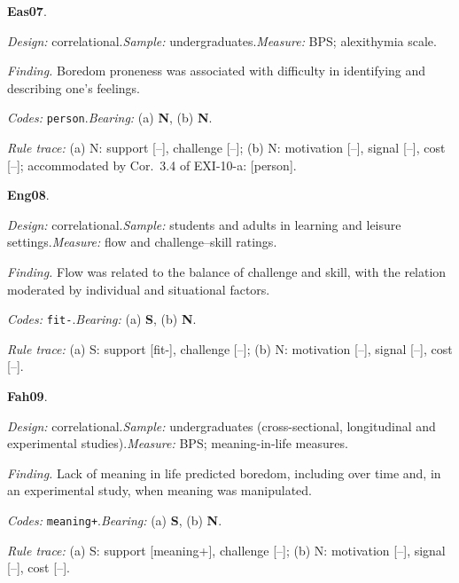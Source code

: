 \medskip
{}
\noindent\textbf{Eas07}\enspace \citet{Eastwood2007}.\par
{\small\noindent\textit{Design:} correlational.\quad \textit{Sample:} undergraduates.\quad \textit{Measure:} BPS; alexithymia scale.\par
\noindent\textit{Finding.} Boredom proneness was associated with difficulty in identifying and describing one's feelings.\par
\noindent\textit{Codes:} \texttt{person}.\quad \textit{Bearing:} (a) \textbf{N}, (b) \textbf{N}.\par
\noindent\textit{Rule trace:} (a) N: support {[}--{]}, challenge {[}--{]}; (b) N: motivation {[}--{]}, signal {[}--{]}, cost {[}--{]}; accommodated by Cor.~3.4 of EXI-10-a: {[}person{]}.\par}
\medskip
{}
\noindent\textbf{Eng08}\enspace \citet{EngeserRheinberg2008}.\par
{\small\noindent\textit{Design:} correlational.\quad \textit{Sample:} students and adults in learning and leisure settings.\quad \textit{Measure:} flow and challenge--skill ratings.\par
\noindent\textit{Finding.} Flow was related to the balance of challenge and skill, with the relation moderated by individual and situational factors.\par
\noindent\textit{Codes:} \texttt{fit-}.\quad \textit{Bearing:} (a) \textbf{S}, (b) \textbf{N}.\par
\noindent\textit{Rule trace:} (a) S: support {[}fit-{]}, challenge {[}--{]}; (b) N: motivation {[}--{]}, signal {[}--{]}, cost {[}--{]}.\par}
\medskip
{}
\noindent\textbf{Fah09}\enspace \citet{Fahlman2009}.\par
{\small\noindent\textit{Design:} correlational.\quad \textit{Sample:} undergraduates (cross-sectional, longitudinal and experimental studies).\quad \textit{Measure:} BPS; meaning-in-life measures.\par
\noindent\textit{Finding.} Lack of meaning in life predicted boredom, including over time and, in an experimental study, when meaning was manipulated.\par
\noindent\textit{Codes:} \texttt{meaning+}.\quad \textit{Bearing:} (a) \textbf{S}, (b) \textbf{N}.\par
\noindent\textit{Rule trace:} (a) S: support {[}meaning+{]}, challenge {[}--{]}; (b) N: motivation {[}--{]}, signal {[}--{]}, cost {[}--{]}.\par}
